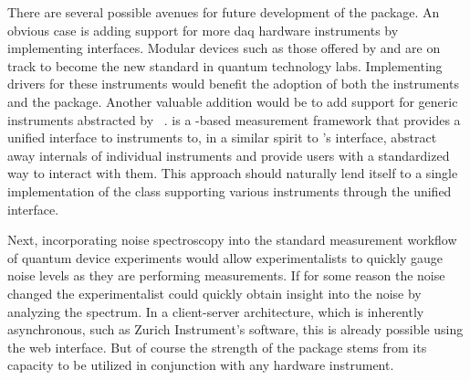 There are several possible avenues for future development of the \pyspeck package.
An obvious case is adding support for more \gls{daq} hardware instruments by implementing  interfaces.
Modular devices such as those offered by  and  are on track to become the new standard in quantum technology labs.
Implementing drivers for these instruments would benefit the adoption of both the instruments and the \pyspeck package.
Another valuable addition would be to add support for generic instruments abstracted by \qumada~\cite{Huckemann2025a}.
\qumada is a \qcodes-based measurement framework that provides a unified interface to instruments to, in a similar spirit to \pyspeck's  interface, abstract away internals of individual instruments and provide users with a standardized way to interact with them.
This approach should naturally lend itself to a single implementation of the  class supporting various instruments through the unified \qumada interface.

Next, incorporating noise spectroscopy into the standard measurement workflow of quantum device experiments would allow experimentalists to quickly gauge noise levels as they are performing measurements.
If for some reason the noise changed
the experimentalist could quickly obtain insight into the noise by analyzing the spectrum.
In a client-server architecture, which is inherently asynchronous, such as Zurich Instrument's  software, this is already possible using the web interface.
But of course the strength of the \pyspeck package stems from its capacity to be utilized in conjunction with any hardware instrument.

